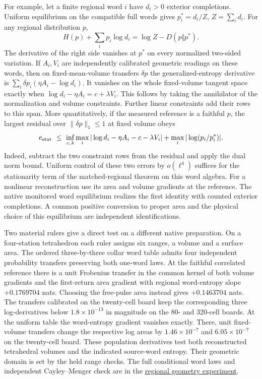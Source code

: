 \documentclass[11pt]{article}
\begin{document}
For example, let a finite regional word $i$ have $d_i>0$ exterior
completions. Uniform equilibrium on the compatible full words gives
$p_i^*=d_i/Z$, $Z=\sum_i d_i$. For any regional distribution $p$,
\[
 H(p)+\sum_i p_i\log d_i=\log Z-D(p\Vert p^*).
\]
The derivative of the right side vanishes at $p^*$ on every normalized
two-sided variation. If $A_i,V_i$ are independently calibrated geometric
readings on these words, then on fixed-mean-volume transfers
$\delta p$ the generalized-entropy derivative is
$\sum_i\delta p_i(\eta A_i-\log d_i)$. It vanishes on the whole
fixed-volume tangent space exactly when $\log d_i-\eta A_i=c+\lambda V_i$.
This follows by taking the annihilator of the normalization and volume
constraints. Further linear constraints add their rows to this span.
More quantitatively, if the measured reference is a faithful $p$,
the largest residual over $\|\delta p\|_1\leq1$ at fixed volume obeys
\[
 e_{\rm stat}\ \leq\
 \inf_{c,\lambda}\max_i|\log d_i-\eta A_i-c-\lambda V_i|
 +\max_i|\log(p_i/p_i^*)|.
\]
Indeed, subtract the two constraint rows from the residual and apply
the dual norm bound. Uniform control of these two errors by $o(\ell^4)$
suffices for the stationarity term of the matched-regional theorem on
this word algebra. For a nonlinear reconstruction use its area and volume
gradients at the reference. The native monitored word equilibrium realizes the first
identity with counted exterior completions. A common positive conversion
to proper area and the physical choice of this equilibrium are independent
identifications.

Two material rulers give a direct test on a different native preparation.
On a four-station tetrahedron each ruler assigns six ranges, a volume
and a surface area. The ordered three-by-three collar word table admits
four independent probability transfers preserving both one-word laws.
At the faithful correlated reference there is a unit Frobenius transfer
in the common kernel of both volume gradients and the first-return area
gradient with regional word-entropy slope $+0.1769704$ nats.
Choosing the free-pulse area instead gives $+0.1463704$ nats.
The transfers calibrated on the twenty-cell board keep the corresponding
three log-derivatives below $1.8\times10^{-13}$ in magnitude on the
80- and 320-cell boards. At the uniform table the word-entropy gradient
vanishes exactly. There, unit fixed-volume transfers change the respective
log areas by $1.46\times10^{-7}$ and $6.05\times10^{-7}$ on the twenty-cell
board. These population derivatives test both reconstructed tetrahedral
volumes and the indicated source-word entropy. Their geometric domain is
set by the held range checks. The full conditional word laws and independent
Cayley--Menger check are in the
\href{https://github.com/FloatingPragma/observer-patch-holography/tree/main/model/experiments/interval_echo_einstein_station/regional_geometry}{regional geometry experiment}.
\end{document}
